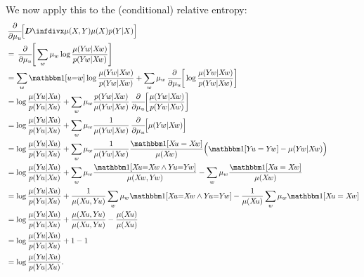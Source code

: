 \begin{subappendices}
\begin{lproof}
    We now apply this to the (conditional) relative entropy:
    \begin{align*}
        &\pd/d\mu_u [ \kldiv{\mu(X,Y)}{\mu(X) p(Y|X) }] \\
            &= \pd/d\mu_u [ \sum_{w} \mu_w \log \frac{\mu(Y\! w | X\! w)}{ p(Y\! w | X\! w)} ] \\
            &= \sum_{w} \mathbbm1[u{=}w]  \log \frac{\mu(Y\! w | X\! w)}{  p(Y\! w | X\! w)}
                + \sum_{w} \mu_w  \pd/d\mu_u [  \log \frac{\mu(Y\! w | X\! w)}{  p(Y\! w | X\! w)} ] \\
            &=  \log \frac{\mu(Y\! u | X\! u)}{  p(Y\! u | X\! u)}
                + \sum_{w} \mu_w
                \frac{  p(Y\! w | X\! w)}{\mu(Y\! w | X\! w)}
                \pd/d\mu_u [ \frac{\mu(Y\! w | X\! w)}{  p(Y\! w | X\! w)} ] \\
            &=  \log \frac{\mu(Y\! u | X\! u)}{  p(Y\! u | X\! u)}
                + \sum_{w} \mu_w
                \frac{1}{\mu(Y\! w | X\! w)}
                \pd/d\mu_u [\mu(Y\! w | X\! w) ] \\
            &=  \log \frac{\mu(Y\! u | X\! u)}{  p(Y\! u | X\! u)}
                + \sum_{w} \mu_w
                \frac{1}{\mu(Y\! w | X\! w)}
                 \frac{\mathbbm1[X\!u = X\!w]}{\mu(X\!w)}\Big( \mathbbm1[Y\!u=Y\!w] - \mu(Y\!w|X\!w) \Big)\\
            &=  \log \frac{\mu(Y\! u | X\! u)}{  p(Y\! u | X\! u)}
                + \sum_{w} \mu_w  \frac{\mathbbm1[X\!u{=}X\!w \land Y\!u{=}Y\!w]}
                    {\mu(X\!w, Y\!w)}
                - \sum_{w} \mu_w \frac{\mathbbm1[X\!u = X\!w]}{\mu(X\!w)}
                \\
            &=  \log \frac{\mu(Y\! u | X\! u)}{  p(Y\! u | X\! u)}
                + \frac{1}{\mu(X\!u, Y\!u)} \sum_w \mu_w  \mathbbm1[X\!u{=}X\!w \land Y\!u{=}Y\!w]
                - \frac{1}{\mu(X\!u)} \sum_w \mu_w \mathbbm1[X\!u = X\!w]
                \\
            &=  \log \frac{\mu(Y\! u | X\! u)}{  p(Y\! u | X\! u)}
                + \frac{\mu(X\!u, Y\!u)}{\mu(X\!u, Y\!u)}
                - \frac{\mu(X\!u)}{\mu(X\!u)}   \\
            &= \log \frac{\mu(Y\! u | X\! u)}{  p(Y\! u | X\! u)} + 1 - 1 \\
            &= \log \frac{\mu(Y\! u | X\! u)}{  p(Y\! u | X\! u)}
            .
    \end{align*}


\end{lproof}
\end{subappendices}
